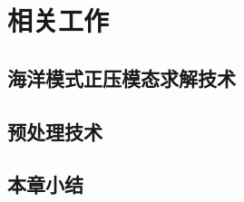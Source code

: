 \chapter{相关工作}
\label{cha:related}

\section{海洋模式正压模态求解技术}
\label{related:baro}

\section{预处理技术}
\label{related:precond}

\section{本章小结}
\label{related:Conclude}